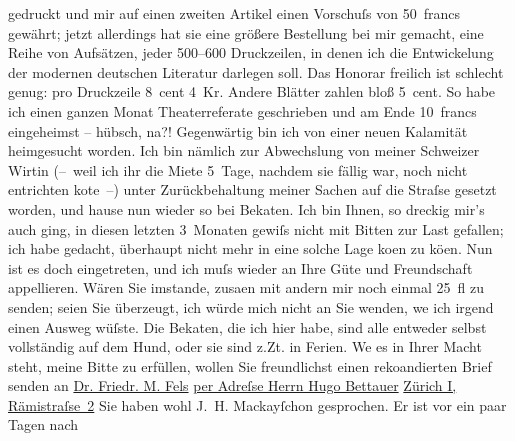 \begin{ledgroupsized}[t]{13cm}
               gedruckt und mir auf einen zweiten Artikel einen Vorschuſs von 50 francs gewährt;
               jetzt allerdings hat sie eine größere Bestellung bei mir gemacht, eine Reihe von
               Aufsätzen, jeder 500–600 Druckzeilen, in denen ich die Entwickelung der modernen
               deutschen Literatur darlegen soll. Das Honorar freilich ist schlecht genug: pro
               Druckzeile 8 cent 4 Kr. Andere Blätter zahlen bloß 5 cent. So habe ich einen ganzen
               Monat Theaterreferate geschrieben und am Ende 10 francs eingeheimst – hübsch,
               na?!\pend
           \pstart
           {\pb}Gegenwärtig bin ich von einer neuen Kalamität
               heimgesucht worden. Ich bin nämlich zur Abwechslung von meiner Schweizer Wirtin (– weil ich ihr die Miete 5 Tage, nachdem sie fällig war, noch nicht
               entrichten ko{\geminationn}te –) unter Zurückbehaltung meiner Sachen
               auf die Straſse gesetzt worden, und hause nun wieder so bei Beka{\geminationn}ten. Ich bin Ihnen, so dreckig mir’s auch ging, in
               diesen letzten 3 Monaten gewiſs nicht mit Bitten zur Last gefallen; ich habe gedacht,
               überhaupt nicht mehr in eine solche Lage ko{\geminationm}en zu kö{\geminationn}en. Nun ist es doch eingetreten, und ich muſs wieder an
               Ihre Güte und Freundschaft appellieren. Wären Sie imstande, zusa{\geminationm}en mit andern mir noch einmal 25 fl zu senden; seien
               Sie überzeugt, ich würde mich nicht an Sie wenden, we{\geminationn}
               ich irgend einen Ausweg wüſste. Die Beka{\geminationn}ten, die ich
               hier habe, sind alle entweder selbst vollständig auf dem Hund, oder sie sind z.Zt. in
               Ferien. We{\geminationn} es in Ihrer Macht steht, meine Bitte zu
               erfüllen, wollen Sie freundlichst einen reko{\geminationm}andierten
               Brief senden an\pend
           \pstart
           \centering{}\uline{Dr. Friedr. M. Fels}\pend
           \pstart
           \noindent{}\centering{}\uline{per Adreſse Herrn Hugo
                     Bettauer}\pend
           \pstart
           \noindent{}\raggedleft{}\uline{Zürich I, Rämistraſse 2}\pend
           \pstart
           \noindent{}{\pb}Sie haben wohl J. H. Mackayſchon gesprochen. Er ist vor ein paar Tagen nach

\end{ledgroupsized}
